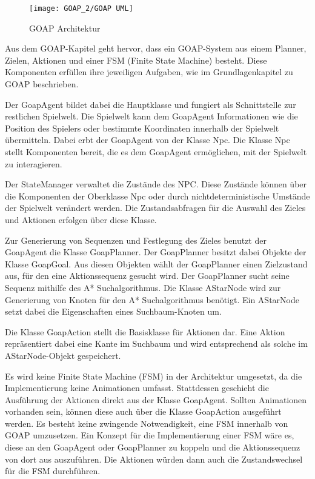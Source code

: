 \begin{figure}[h]
  \centering
  \texttt{[image: GOAP\_2/GOAP UML]}
	\captionsetup{justification=justified, format=plain}
  \caption{GOAP Architektur}
  \label{GOAP Architektur eines Agenten}
\end{figure}

Aus dem GOAP-Kapitel geht hervor, dass ein GOAP-System aus einem Planner, Zielen, Aktionen und einer FSM (Finite State Machine) besteht. Diese Komponenten erfüllen ihre jeweiligen Aufgaben, wie im Grundlagenkapitel zu GOAP beschrieben.

Der GoapAgent bildet dabei die Hauptklasse und fungiert als Schnittstelle zur restlichen Spielwelt. Die Spielwelt kann dem GoapAgent Informationen wie die Position des Spielers oder bestimmte Koordinaten innerhalb der Spielwelt übermitteln. Dabei erbt der GoapAgent von der Klasse Npc. Die Klasse Npc stellt Komponenten bereit, die es dem GoapAgent ermöglichen, mit der Spielwelt zu interagieren.

Der StateManager verwaltet die Zustände des NPC. Diese Zustände können über die Komponenten der Oberklasse Npc oder durch nichtdeterministische Umstände der Spielwelt verändert werden. Die Zustandsabfragen für die Auswahl des Zieles und Aktionen erfolgen über diese Klasse.

Zur Generierung von Sequenzen und Festlegung des Zieles benutzt der GoapAgent die Klasse GoapPlanner. Der GoapPlanner besitzt dabei Objekte der Klasse GoapGoal. Aus diesen Objekten wählt der GoapPlanner einen Zielzustand aus, für den eine Aktionssequenz gesucht wird. Der GoapPlanner sucht seine Sequenz mithilfe des A* Suchalgorithmus. Die Klasse AStarNode wird zur Generierung von Knoten für den A* Suchalgorithmus benötigt. Ein AStarNode setzt dabei die Eigenschaften eines Suchbaum-Knoten um.

Die Klasse GoapAction stellt die Basisklasse für Aktionen dar. Eine Aktion repräsentiert dabei eine Kante im Suchbaum und wird entsprechend als solche im AStarNode-Objekt gespeichert.

Es wird keine Finite State Machine (FSM) in der Architektur umgesetzt, da die Implementierung keine Animationen umfasst. Stattdessen geschieht die Ausführung der Aktionen direkt aus der Klasse GoapAgent. Sollten Animationen vorhanden sein, können diese auch über die Klasse GoapAction ausgeführt werden. Es besteht keine zwingende Notwendigkeit, eine FSM innerhalb von GOAP umzusetzen. Ein Konzept für die Implementierung einer FSM wäre es, diese an den GoapAgent oder GoapPlanner zu koppeln und die Aktionssequenz von dort aus auszuführen. Die Aktionen würden dann auch die Zustandswechsel für die FSM durchführen.


